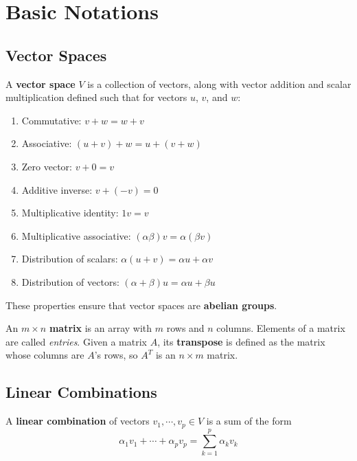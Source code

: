 \chapter{Basic Notations}

\section{Vector Spaces}
\begin{definition}
A \textbf{vector space} $V$ is a collection of vectors, along with vector addition and scalar multiplication defined such that for vectors $u$, $v$, and $w$: 

\begin{enumerate}
	\item Commutative: $v + w = w + v$
	\item Associative: $(u + v) + w = u + (v + w)$
	\item Zero vector: $ v + 0 = v$
	\item Additive inverse: $ v + (-v) = 0$
	\item Multiplicative identity: $ 1v = v$
	\item Multiplicative associative: $ (\alpha \beta)v = \alpha(\beta v)$
	\item Distribution of scalars: $ \alpha(u + v) = \alpha u + \alpha v$
	\item Distribution of vectors: $ (\alpha + \beta)u = \alpha u + \beta u$
\end{enumerate}
\end{definition}

These properties ensure that vector spaces are \textbf{abelian groups}.

\begin{definition}
An $m \times n$ \textbf{matrix} is an array with $m$ rows and $n$ columns. Elements of a matrix are called \textit{entries}. Given a matrix $A$, its \textbf{transpose} is defined as the matrix whose columns are $A$'s rows, so $A^{T}$ is an $n \times m$ matrix. 
\end{definition}

\section{Linear Combinations}
\begin{definition}
A \textbf{linear combination} of vectors $v_{1}, \cdots, v_{p} \in V$ is a sum of the form 
$$\alpha_{1} v_{1} + \cdots + \alpha_{p} v_{p} = \sum_{k = 1}^{p} \alpha_{k} v_{k}$$
\end{definition}

